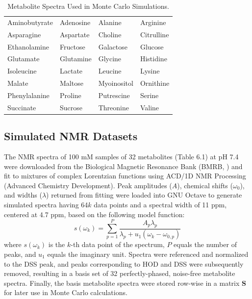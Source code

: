 \begin{table}[h!]
\caption{Metabolite Spectra Used in Monte Carlo Simulations.}
\begin{center}
\begin{tabular}{l l l l}
  \hline
  Aminobutyrate & Adenosine & Alanine     & Arginine   \\
  Asparagine    & Aspartate & Choline     & Citrulline \\
  Ethanolamine  & Fructose  & Galactose   & Glucose    \\
  Glutamate     & Glutamine & Glycine     & Histidine  \\
  Isoleucine    & Lactate   & Leucine     & Lysine     \\
  Malate        & Maltose   & Myoinositol & Ornithine  \\
  Phenylalanine & Proline   & Putrescine  & Serine     \\
  Succinate     & Sucrose   & Threonine   & Valine
\end{tabular}
\end{center}
\end{table}

\subsection{Simulated NMR Datasets}

\begin{doublespace}
The \hnmr{} NMR spectra of 100 mM samples of 32 metabolites (Table 6.1) at
pH 7.4 were downloaded from the Biological Magnetic Resonance Bank
(BMRB, \cite{ulrich:nar2008}) and fit to mixtures of complex Lorentzian
functions using ACD/1D NMR Processing (Advanced Chemistry Development).
Peak amplitudes ($A$), chemical shifts ($\omega_0$), and widths ($\lambda$)
returned from fitting were loaded into GNU Octave to generate simulated spectra
having 64$k$ data points and a spectral width of 11 ppm, centered at
4.7 ppm, based on the following model function:
\begin{equation}
s(\omega_k) =
 \sum_{p=1}^P
 \frac{A_p \lambda_p}
      {\lambda_p + u_1 (\omega_k - \omega_{0,p})}
\end{equation}
where $s(\omega_k)$ is the $k$-th data point of the spectrum, $P$ equals the
number of peaks, and $u_1$ equals the imaginary unit. Spectra were referenced
and normalized to the DSS peak, and peaks corresponding to HOD and DSS were
subsequently removed, resulting in a basis set of 32 perfectly-phased,
noise-free metabolite spectra. Finally, the basis metabolite spectra were
stored row-wise in a matrix $\mathbf{S}$ for later use in Monte Carlo
calculations.
\end{doublespace}

